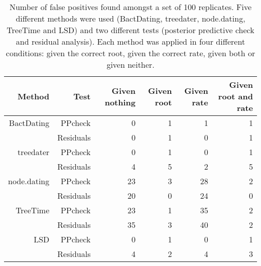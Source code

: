 \begin{table}[ht]
\centering
\begin{tabular}{|r|r|r|r|r|r|}
   \hline
Method & Test & Given nothing & Given root & Given rate & Given root and rate \\ 
   \hline
BactDating & PPcheck & 0 & 1 & 1 & 1 \\ 
   & Residuals & 0 & 1 & 0 & 1 \\ 
  treedater & PPcheck & 0 & 1 & 0 & 1 \\ 
   & Residuals & 4 & 5 & 2 & 5 \\ 
  node.dating & PPcheck & 23 & 3 & 28 & 2 \\ 
   & Residuals & 20 & 0 & 24 & 0 \\ 
  TreeTime & PPcheck & 23 & 1 & 35 & 2 \\ 
   & Residuals & 35 & 3 & 40 & 2 \\ 
  LSD & PPcheck & 0 & 1 & 0 & 1 \\ 
   & Residuals & 4 & 2 & 4 & 3 \\ 
   \hline
\end{tabular}
\caption{Number of false positives found amongst a set of 100 replicates. Five different methods were used (BactDating, treedater, node.dating, TreeTime and LSD)
and two different tests (posterior predictive check and residual analysis). Each method was applied in four different conditions: given the correct root, given the
correct rate, given both or given neither.} 
\label{tab:falsePos}
\end{table}

